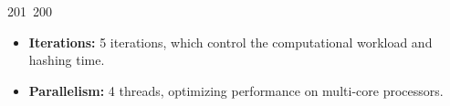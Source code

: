 201~200~\documentclass{article}
\begin{document}
\begin{itemize}
	                                                                                                                                                                                                                                                                                                	                                                                                                                                        	    	                                                                                                	                                                                                                                                                                                                                                                                                                                                	                                                                        	                                                                        	                                                                                            \item \textbf{Iterations:} 5 iterations, which control the computational workload and hashing time.
	                                                                                                                                                                                                                                                                                                	                                                                                                                                        	    	                                                                                                	                                                                                                                                                                                                                                                                                                                                	                                                                        	                                                                        	                                                                                                \item \textbf{Parallelism:} 4 threads, optimizing performance on multi-core processors.

\end{itemize}
\end{document}

